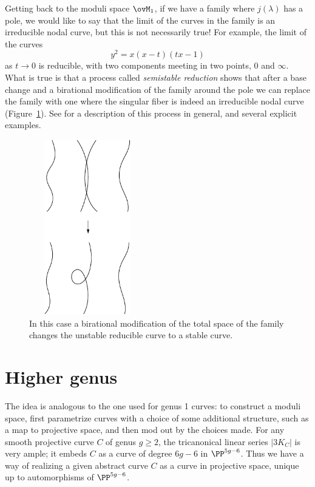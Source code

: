 Getting back to the moduli space $\ovM_1$, if we have a family where
$j(\lambda)$ has a pole, we would like to say that the limit of the curves in the family is an irreducible nodal curve,
but this is not necessarily true! For example, the limit of the curves
$$
y^2 = x(x-t)(tx-1)
$$
as $t \to 0$ is reducible, with two components meeting in two points, 0 and $\infty$.
What is true is that a process called
\emph{semistable reduction}
%
shows that after a base change and a birational
modification of the family around the pole we can replace the family with one where the singular fiber
is indeed an irreducible nodal curve
(Figure~\ref{unstable to stable}).
See \cite{MR1631825} for a description of this process in
general, and several explicit examples.

\begin{figure}
\centerline{\includegraphics[width=2in,height=3in]{"main/Fig07-1"}}
\caption{In this case a birational modification of the
total space of the family changes the unstable reducible curve to a stable curve.}
\label{unstable to stable}
\end{figure}

\section{Higher genus}

The  idea  is  analogous to the one used  for genus 1 curves: to
construct a moduli space, first parametrize curves with a choice of
some additional structure, such as a map to projective space, and then
mod out by the choices made. For any smooth projective curve $C$ of
genus $g\geq 2$, the tricanonical linear series
%
%
$|3K_C|$ is very
ample; it embeds $C$ as a curve of degree $6g-6$ in $\PP^{5g-6}$. Thus
we have a way of realizing a given abstract curve $C$ as a curve in
projective space, unique up to automorphisms of $\PP^{5g-6}$.

